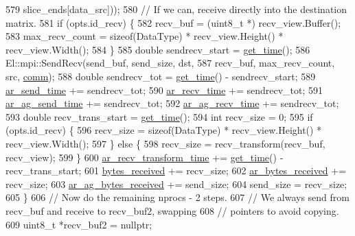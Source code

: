 \begin{DoxyCode}
579                                 slice\_ends[data\_src]));
580     \textcolor{comment}{// If we can, receive directly into the destination matrix.}
581     \textcolor{keywordflow}{if} (opts.id\_recv) \{
582       recv\_buf = (uint8\_t *) recv\_view.Buffer();
583       max\_recv\_count = \textcolor{keyword}{sizeof}(DataType) * recv\_view.Height() * recv\_view.Width();
584     \}
585     \textcolor{keywordtype}{double} sendrecv\_start = \hyperlink{namespacelbann_a478d36031ff0659893c4322cd856157f}{get\_time}();
586     El::mpi::SendRecv(send\_buf, send\_size, dst,
587                       recv\_buf, max\_recv\_count, src, \hyperlink{file__io_8cpp_ab048c6f9fcbcfaa57ce68b00263dbebe}{comm});
588     \textcolor{keywordtype}{double} sendrecv\_tot = \hyperlink{namespacelbann_a478d36031ff0659893c4322cd856157f}{get\_time}() - sendrecv\_start;
589     \hyperlink{classlbann_1_1lbann__comm_a60a664f47efb52d9936b72d34059d1ef}{ar\_send\_time} += sendrecv\_tot;
590     \hyperlink{classlbann_1_1lbann__comm_a4c9323938961c3524dc67f4b7b47e3ae}{ar\_recv\_time} += sendrecv\_tot;
591     \hyperlink{classlbann_1_1lbann__comm_a64cb0b86e9368c1d83370ba6cb0083ba}{ar\_ag\_send\_time} += sendrecv\_tot;
592     \hyperlink{classlbann_1_1lbann__comm_a1896c3ecd1d5b084497c6ed47c1c9bae}{ar\_ag\_recv\_time} += sendrecv\_tot;
593     \textcolor{keywordtype}{double} recv\_trans\_start = \hyperlink{namespacelbann_a478d36031ff0659893c4322cd856157f}{get\_time}();
594     \textcolor{keywordtype}{int} recv\_size = 0;
595     \textcolor{keywordflow}{if} (opts.id\_recv) \{
596       recv\_size = \textcolor{keyword}{sizeof}(DataType) * recv\_view.Height() * recv\_view.Width();
597     \} \textcolor{keywordflow}{else} \{
598       recv\_size = recv\_transform(recv\_buf, recv\_view);
599     \}
600     \hyperlink{classlbann_1_1lbann__comm_adb393f47d60eaa59bace80d2d3dd3bf2}{ar\_recv\_transform\_time} += \hyperlink{namespacelbann_a478d36031ff0659893c4322cd856157f}{get\_time}() - recv\_trans\_start;
601     \hyperlink{classlbann_1_1lbann__comm_afb99f57f7eafc0695bf28e6c26a8120f}{bytes\_received} += recv\_size;
602     \hyperlink{classlbann_1_1lbann__comm_aa5f3c53358bf9002b9fab41918b0c8c1}{ar\_bytes\_received} += recv\_size;
603     \hyperlink{classlbann_1_1lbann__comm_afded6f478dc5021d1edec306dc6c528c}{ar\_ag\_bytes\_received} += send\_size;
604     send\_size = recv\_size;
605   \}
606   \textcolor{comment}{// Now do the remaining nprocs - 2 steps.}
607   \textcolor{comment}{// We always send from recv\_buf and receive to recv\_buf2, swapping}
608   \textcolor{comment}{// pointers to avoid copying.}
609   uint8\_t *recv\_buf2 = \textcolor{keyword}{nullptr};

\end{DoxyCode}
